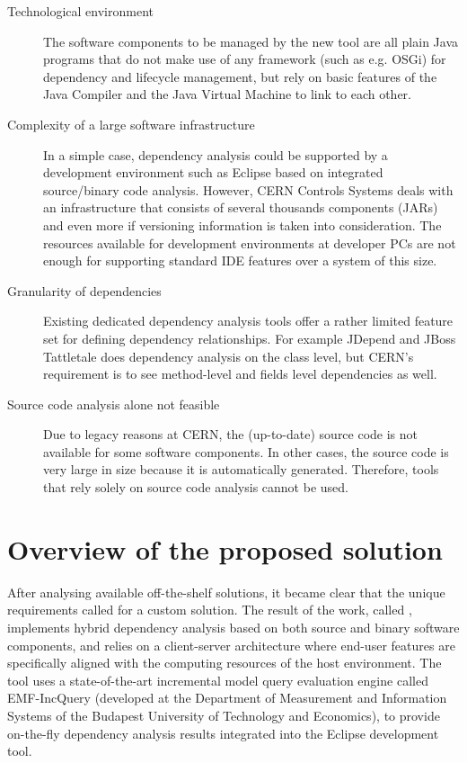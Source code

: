 \begin{description}
\item[Technological environment] The software components to be managed by the
new tool are all plain Java programs that do not make use of any framework (such
as e.g. OSGi) for dependency and lifecycle management, but rely on basic
features of the Java Compiler and the Java Virtual Machine to link to each
other.
 
\item[Complexity of a large software infrastructure] In a simple case,
dependency analysis could be supported by a development environment such as
Eclipse based on integrated source/binary code analysis. However, CERN Controls
Systems deals with an infrastructure that consists of several thousands
components (JARs) and even more if versioning information is taken into
consideration. The resources available for development environments at developer
PCs are not enough for supporting standard IDE features over a system of this
size.
 
\item[Granularity of dependencies] Existing dedicated dependency analysis
tools offer a rather limited feature set for defining dependency relationships.
For example JDepend \cite{JDepend} and JBoss Tattletale \cite{Tattletale} does
dependency analysis on the class level, but CERN's requirement is to see
method-level and fields level dependencies as well.

\item[Source code analysis alone not feasible] Due to legacy reasons at CERN,
the (up-to-date) source code is not available for some software components. In
other cases, the source code is very large in size because it is automatically
generated. Therefore, tools that rely solely on source code analysis cannot be
used.

\end{description}

\section{Overview of the proposed solution}
After analysing available off-the-shelf solutions, it became clear that the
unique requirements called for a custom solution. The result of the work, called
\ptool{}, implements hybrid dependency analysis based on both source and binary
software components, and relies on a client-server architecture where end-user
features are specifically aligned with the computing resources of the host
environment. The tool uses a state-of-the-art incremental model query evaluation
engine called EMF-IncQuery (developed at the Department of Measurement and
Information Systems of the Budapest University of Technology and Economics), to
provide on-the-fly dependency analysis results integrated into the Eclipse
development tool.


